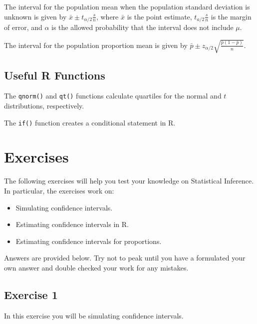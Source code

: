 \documentclass[
  letterpaper,
  DIV=11,
  numbers=noendperiod]{scrreprt}
\begin{document}
The interval for the population mean when the population standard
deviation is unknown is given by
\(\bar x \pm t_{\alpha/2} \frac {s}{n}\), where \(\bar x\) is the point
estimate, \(t_{a/2} \frac {s}{n}\) is the margin of error, and
\(\alpha\) is the allowed probability that the interval does not include
\(\mu\).

The interval for the population proportion mean is given by
\(\bar p \pm z_{\alpha/2} \sqrt{\frac {\bar p (1-\bar p)}{n}}\).

\hypertarget{useful-r-functions-11}{%
\subsection*{Useful R Functions}\label{useful-r-functions-11}}

The \texttt{qnorm()} and \texttt{qt()} functions calculate quartiles for
the normal and \(t\) distributions, respectively.

The \texttt{if()} function creates a conditional statement in R.

\hypertarget{exercises-11}{%
\section{Exercises}\label{exercises-11}}

The following exercises will help you test your knowledge on Statistical
Inference. In particular, the exercises work on:

\begin{itemize}
\item
  Simulating confidence intervals.
\item
  Estimating confidence intervals in R.
\item
  Estimating confidence intervals for proportions.
\end{itemize}

Answers are provided below. Try not to peak until you have a formulated
your own answer and double checked your work for any mistakes.

\hypertarget{exercise-1-22}{%
\subsection*{Exercise 1}\label{exercise-1-22}}

In this exercise you will be simulating confidence intervals.
\end{document}
